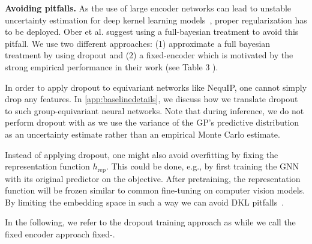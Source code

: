 \textbf{Avoiding pitfalls.}
As the use of large encoder networks can lead to unstable uncertainty estimation for deep kernel learning models~\citep{ober_promises_2021}, proper regularization has to be deployed.
Ober et al. suggest using a full-bayesian treatment to avoid this pitfall. We use two different approaches: (1) approximate a full bayesian treatment by using dropout \cite{gal2016dropout, srivastava2014dropout} and (2) a fixed-encoder which is motivated by the strong empirical performance in their work (see Table 3 \citet{ober_promises_2021}).

In order to apply dropout to equivariant networks like NequIP, one cannot simply drop any features.
In \autoref{app:baselinedetails}, we discuss how we translate dropout to such group-equivariant neural networks.
Note that during inference, we do not perform dropout with \oursacro{} as we use the variance of the GP's predictive distribution as an uncertainty estimate rather than an empirical Monte Carlo estimate.

Instead of applying dropout, one might also avoid overfitting by fixing the representation function $h_\text{rep}$.
This could be done, e.g., by first training the GNN with its original predictor on the objective.
After pretraining, the representation function will be frozen similar to common fine-tuning on computer vision models.
By limiting the embedding space in such a way we can avoid DKL pitfalls~\citep{ober_promises_2021}.

In the following, we refer to the dropout training approach as \oursacro{} while we call the fixed encoder approach fixed-\oursacro{}.
